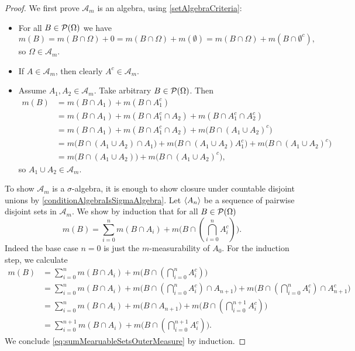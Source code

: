 \begin{proof}
We first prove $\mathcal{A}_m$ is an algebra, using \ref{setAlgebraCriteria}:
\begin{itemize}
\item For all $B\in \operatorname{\mathcal{P}}(\Omega)$ we have
\[ m(B) = m(B\cap \Omega) + 0 = m(B\cap \Omega) + m(\emptyset) = m(B\cap \Omega) + m(B\cap \emptyset^c), \]
so $\Omega\in \mathcal{A}_m$.
\item If $A\in \mathcal{A}_m$, then clearly $A^c\in \mathcal{A}_m$.
\item Assume $A_1,A_2 \in \mathcal{A}_m$. Take arbitrary $B\in\operatorname{\mathcal{P}}(\Omega)$. Then
\begin{align*}
m(B) &= m(B\cap A_1) + m(B\cap A_1^c) \\
&= m(B\cap A_1) + m(B\cap A_1^c\cap A_2) + m(B\cap A_1^c\cap A_2^c) \\
&= m(B\cap A_1) + m(B\cap A_1^c\cap A_2) + m\big(B\cap (A_1\cup A_2)^c\big) \\
&= m\big(B\cap (A_1\cup A_2)\cap A_1\big) + m\big(B\cap (A_1\cup A_2)A_1^c\big) + m\big(B\cap (A_1\cup A_2)^c\big) \\
&= m\big(B\cap (A_1\cup A_2)\big) + m\big(B\cap (A_1\cup A_2)^c\big),
\end{align*}
so $A_1\cup A_2\in \mathcal{A}_m$.
\end{itemize}
To show $\mathcal{A}_m$ is a $\sigma$-algebra, it is enough to show closure under countable disjoint unions by \ref{conditionAlgebraIsSigmaAlgebra}. Let $\left\langle A_n \right\rangle$ be a sequence of pairwise disjoint sets in $\mathcal{A}_m$. We show by induction that for all $B\in \operatorname{\mathcal{P}}(\Omega)$
\begin{equation} m(B) = \sum_{i=0}^nm(B\cap A_i) + m\big(B\cap (\bigcap_{i=0}^nA_i^c)\big). \label{eq:sumMearuableSetsOuterMeasure}\end{equation}
Indeed the base case $n=0$ is just the $m$-measurability of $A_0$. For the induction step, we calculate
\begin{align*}
m(B) &= \sum_{i=0}^nm(B\cap A_i) + m\big(B\cap (\bigcap_{i=0}^nA_i^c)\big) \\
&= \sum_{i=0}^nm(B\cap A_i) + m\big(B\cap (\bigcap_{i=0}^nA_i^c)\cap A_{n+1}\big) + m\big(B\cap (\bigcap_{i=0}^nA_i^c)\cap A_{n+1}^c\big) \\
&= \sum_{i=0}^nm(B\cap A_i) + m\big(B\cap A_{n+1}\big) + m\big(B\cap (\bigcap_{i=0}^{n+1}A_i^c)\big) \\
&= \sum_{i=0}^{n+1}m(B\cap A_i) + m\big(B\cap (\bigcap_{i=0}^{n+1}A_i^c)\big).
\end{align*}
We conclude \eqref{eq:sumMearuableSetsOuterMeasure} by induction.


\end{proof}
